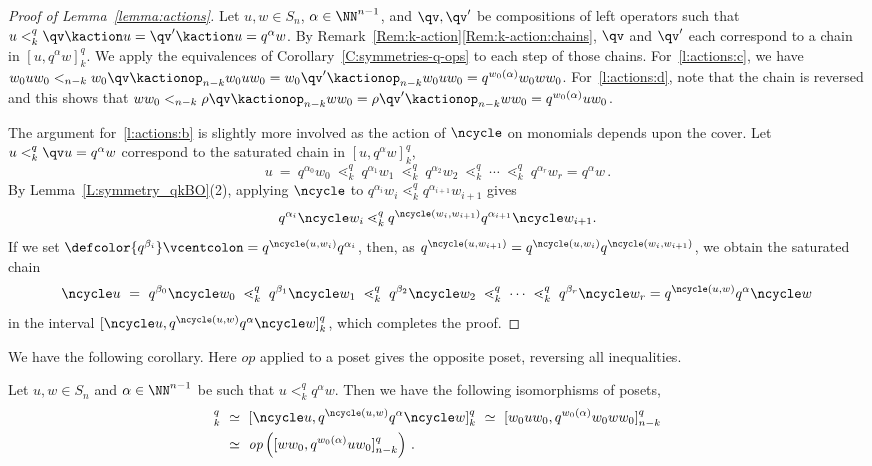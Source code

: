 \begin{proof}[Proof of Lemma~\ref{lemma:actions}]
  Let $u,w\in S_n$, $\alpha\in\NN^{n-1}$, and $\qv,\qv'$ be compositions of left operators such that
  $u<_k^q \qv\kaction u=\qv'\kaction u = q^\alpha w$.
  By Remark~\ref{Rem:k-action}\ref{Rem:k-action:chains},  $\qv$ and $\qv'$ each correspond to a chain in $[u,q^\alpha w]_k^q$.
  We apply the equivalences of Corollary~\ref{C:symmetries-q-ops} to each step of those chains.
  For~\ref{l:actions:c}, we have
  $w_0 uw_0 <_{n-k} w_0\qv\kactionop_{n-k} w_0uw_0 =  w_0\qv'\kactionop_{n-k} w_0uw_0 = q^{w_0(\alpha)}w_0 ww_0$.
  For~\ref{l:actions:d}, note that the chain is reversed and this shows that 
  $w w_0 <_{n-k} \rho\qv\kactionop_{n-k} w w_0 =  \rho\qv'\kactionop_{n-k} w w_0 = q^{w_0(\alpha)}u w_0$.

  The argument for~\ref{l:actions:b} is slightly more involved as the action of $\ncycle$ on monomials depends upon the cover.
  Let $u<_k^q \qv u =  q^{\alpha} w$ correspond to the saturated chain in $[u,q^\alpha w]_k^q$,
  \[
      u\ =\ q^{\alpha_0}w_0\ \lessdot_k^q\ q^{\alpha_1}w_1\ \lessdot_k^q\ q^{\alpha_2}w_2
      \ \lessdot_k^q\ \dotsb\  \lessdot_k^q\ q^{\alpha_r}w_r=q^\alpha w\,.
  \]
  By Lemma~\ref{L:symmetry_qkBO}(2), applying $\ncycle$ to $q^{\alpha_i}w_i\lessdot_k^q q^{\alpha_{i+1}}w_{i+1}$ gives
  $$q^{\alpha_i}\ncycle w_i\lessdot_k^q q^{\ncycle(w_i,w_{i+1})}q^{\alpha_{i+1}}\ncycle w_{i+1}.$$
  If we set $\defcolor{q^{\beta_i}}\vcentcolon=q^{\ncycle(u,w_i)}q^{\alpha_i}$, then, as 
  $q^{\ncycle(u,w_{i+1})}=q^{\ncycle(u,w_i)}q^{\ncycle(w_i,w_{i+1})}$, we obtain the saturated chain
  \[
      \ncycle u\ =\ q^{\beta_0}\ncycle w_0\ \lessdot_k^q\ q^{\beta_1}\ncycle w_1\ \lessdot_k^q\ q^{\beta_2}\ncycle w_2
      \ \lessdot_k^q\ \dotsb\  \lessdot_k^q\ q^{\beta_r}\ncycle w_r=q^{\ncycle(u,w)}q^\alpha \ncycle w\,
  \]
  in the interval $[\ncycle u,q^{\ncycle(u,w)} q^\alpha \ncycle w]_k^q$, which completes the proof.  
\end{proof}

We have the following corollary.
Here $\textit{op}$ applied to a poset gives the opposite poset, reversing all inequalities.

\begin{corollary}\label{C:equivalences}
  Let $u,w\in S_n$ and $\alpha\in\NN^{n-1}$ be such that $u <_k^q q^\alpha w$.
  Then we have the following isomorphisms of posets,
  \begin{align*}
    [u,q^\alpha w]_k^q
    &\ \simeq\ 
    [\ncycle u, q^{\ncycle(u,w)} q^\alpha \ncycle w]_k^q
     \ \simeq\ 
    [w_0 uw_0,q^{w_0(\alpha)} w_0 w w_0]_{n-k}^q\\
    &\ \simeq\ 
    \textit{op}\left([ww_0,q^{w_0(\alpha)} u w_0]_{n-k}^q\right)\,.
  \end{align*}
\end{corollary}

